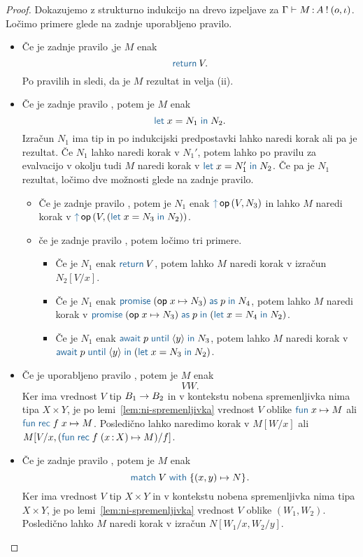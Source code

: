 \begin{proof}
	Dokazujemo z strukturno indukcijo na drevo izpeljave za $\Gamma \vdash M \mathinner{:} A \mathbin{!} (o, \iota)$.
	Ločimo primere glede na zadnje uporabljeno pravilo.
	
	\begin{itemize}
		\item Če je zadnje pravilo ,je $M$ enak $$\tmreturn{V}.$$
		Po pravilih  in  sledi, da je $M$ rezultat in velja (ii).
		
		\item Če je zadnje pravilo , potem je $M$ enak $$\tmlet{x}{N_1}{N_2}.$$
		Izračun $N_1$ ima tip in po indukcijski predpostavki lahko naredi korak ali pa je rezultat. Če $N_1$ lahko naredi korak v $N_1'$, potem lahko po pravilu za evalvacijo v okolju tudi $M$ naredi korak v $\tmlet{x}{N_1'}{N_2}$.
		Če pa je $N_1$ rezultat, ločimo dve možnosti glede na zadnje pravilo. 
		\begin{itemize}
			\item Če je zadnje pravilo , potem je $N_1$ enak $\tmopout{op}{V}{N_3}$ in lahko $M$ naredi korak v $\tmopout{op}{V}{(\tmlet{x}{N_3}{N_2})}$.
			\item če je zadnje pravilo , potem ločimo tri primere.
			\begin{itemize}
				\item Če je $N_1$ enak $\tmreturn{V}$, potem lahko $M$ naredi korak v izračun $N_2[V/x]$.
				\item Če je $N_1$ enak $\tmwith{op}{x}{N_3}{p}{N_4}$, potem lahko $M$ naredi korak v $\tmwith{op}{x}{N_3}{p}{(\tmlet{x}{N_4}{N_2})}$.
				\item Če je $N_1$ enak $\tmawait{p}{y}{N_3}$, potem lahko $M$ naredi korak v $\tmawait{p}{y}{(\tmlet{x}{N_3}{N_2})}$.
			\end{itemize}
			
		\end{itemize}
	
		\item Če je uporabljeno pravilo , potem je $M$ enak $$V W.$$
		Ker ima vrednost $V$ tip $B_1 \to B_2$ in v kontekstu nobena spremenljivka nima tipa $X \times Y$, je po lemi~\ref{lem:ni-spremenljivka} vrednost $V$ oblike $\tmfunano{x}{M}$ ali $\tmfunrecano{f}{x}{M}$.
		Posledično lahko naredimo korak v $M[W/x]$ ali $M[V/x, (\tmfunrec{f}{x \of X}{M})/f]$.
		
		\item Če je zadnje pravilo , potem je $M$ enak $$\tmmatch{V}{(x,y) \mapsto N}.$$
		Ker ima vrednost $V$ tip $X \times Y$ in v kontekstu nobena spremenljivka nima tipa $X \times Y$, je po lemi~\ref{lem:ni-spremenljivka} vrednost $V$ oblike $(W_1,W_2)$.
		Posledično lahko $M$ naredi korak v izračun $N[W_1/x,W_2/y]$.
		

\end{itemize}
\end{proof}
